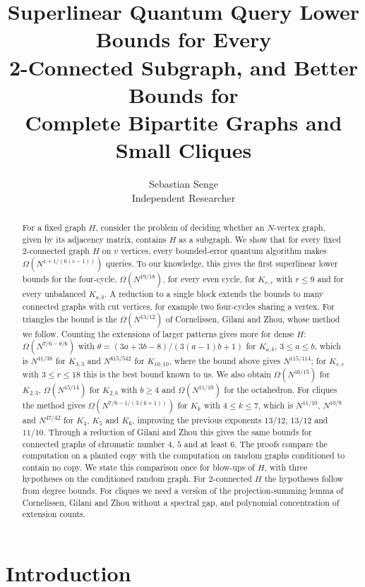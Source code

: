 \documentclass[11pt]{article}
\title{Superlinear Quantum Query Lower Bounds for Every\\ 2-Connected Subgraph, and Better Bounds for\\ Complete Bipartite Graphs and Small Cliques}
\author{Sebastian Senge\\ Independent Researcher}
\date{}
\theoremstyle{remark}
\begin{document}
\maketitle

\begin{abstract}
For a fixed graph $H$, consider the problem of deciding whether an $N$-vertex graph, given by its adjacency matrix, contains $H$ as a subgraph. We show that for every fixed 2-connected graph $H$ on $v$ vertices, every bounded-error quantum algorithm makes $\Omega(N^{1+1/(6(v-1))})$ queries. To our knowledge, this gives the first superlinear lower bounds for the four-cycle, $\Omega(N^{19/18})$, for every even cycle, for $K_{r,r}$ with $r\le9$ and for every unbalanced $K_{a,b}$. A reduction to a single block extends the bounds to many connected graphs with cut vertices, for example two four-cycles sharing a vertex. For triangles the bound is the $\Omega(N^{13/12})$ of Cornelissen, Gilani and Zhou, whose method we follow. Counting the extensions of larger patterns gives more for dense $H$: $\Omega(N^{7/6-\theta/6})$ with $\theta=(3a+3b-8)/(3(a-1)b+1)$ for $K_{a,b}$, $3\le a\le b$, which is $N^{41/38}$ for $K_{3,3}$ and $N^{615/542}$ for $K_{10,10}$, where the bound above gives $N^{115/114}$; for $K_{r,r}$ with $3\le r\le18$ this is the best bound known to us. We also obtain $\Omega(N^{16/15})$ for $K_{2,3}$, $\Omega(N^{15/14})$ for $K_{2,b}$ with $b\ge4$ and $\Omega(N^{11/10})$ for the octahedron. For cliques the method gives $\Omega(N^{7/6-1/(3(k+1))})$ for $K_k$ with $4\le k\le7$, which is $N^{11/10}$, $N^{10/9}$ and $N^{47/42}$ for $K_4$, $K_5$ and $K_6$, improving the previous exponents $13/12$, $13/12$ and $11/10$. Through a reduction of Gilani and Zhou this gives the same bounds for connected graphs of chromatic number $4$, $5$ and at least $6$. The proofs compare the computation on a planted copy with the computation on random graphs conditioned to contain no copy. We state this comparison once for blow-ups of $H$, with three hypotheses on the conditioned random graph. For 2-connected $H$ the hypotheses follow from degree bounds. For cliques we need a version of the projection-summing lemma of Cornelissen, Gilani and Zhou without a spectral gap, and polynomial concentration of extension counts.
\end{abstract}

\section{Introduction}
\end{document}
